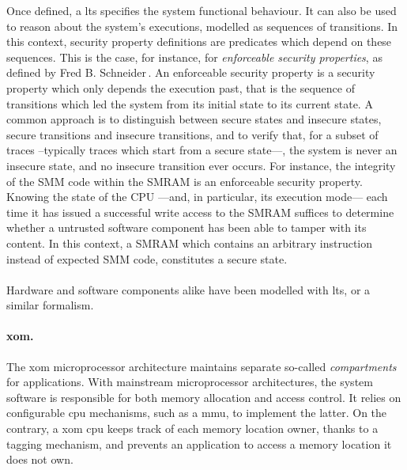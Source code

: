 Once defined, a \ac{lts} specifies the system functional behaviour.
%
It can also be used to reason about the system's executions, modelled as
sequences of transitions.
%
In this context, security property definitions are predicates which depend on
these sequences.
%
This is the case, for instance, for \emph{enforceable security properties}, as
defined by Fred B. Schneider\,\cite{schneider2000enforceable}.
%
An enforceable security property is a security property which only depends the
execution past, that is the sequence of transitions which led the system from
its initial state to its current state.
%
A common approach is to distinguish between secure states and insecure states,
secure transitions and insecure transitions, and to verify that, for a subset of
traces --typically traces which start from a secure state---, the system is
never an insecure state, and no insecure transition ever occurs.
%
For instance, the integrity of the SMM code within the SMRAM is an enforceable
security property.
%
Knowing the state of the CPU ---and, in particular, its execution mode--- each
time it has issued a successful write access to the SMRAM suffices to determine
whether a untrusted software component has been able to tamper with its content.
%
In this context, a SMRAM which contains an arbitrary instruction instead of
expected SMM code, constitutes a secure state.

\paragraph{}
%
Hardware and software components alike have been modelled with \ac{lts}, or
a similar formalism.

\paragraph{\ac{xom}.}
%
The \ac{xom} microprocessor architecture maintains separate so-called
\emph{compartments} for applications.
%
With mainstream microprocessor architectures, the system software is responsible
for both memory allocation and access control.
%
It relies on configurable \ac{cpu} mechanisms, such as a \ac{mmu}, to implement
the latter.
%
On the contrary, a \ac{xom} \ac{cpu} keeps track of each memory location owner,
thanks to a tagging mechanism, and prevents an application to access a memory
location it does not own.

